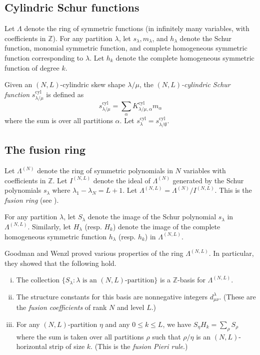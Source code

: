 \documentclass[a4paper,11pt,twoside]{amsart}
\newcommand{\Z}{\mathbb{Z}}
\newcommand{\cyl}{\mathrm{cyl}}
\begin{document}
\subsection{Cylindric Schur functions}
Let $\Lambda$ denote the ring of symmetric functions (in infinitely many variables, with coefficients in $\Z$). For any partition $\lambda$, let $s_{\lambda}, m_{\lambda}$, and $h_{\lambda}$ denote the Schur function, monomial symmetric function, and complete homogeneous symmetric function corresponding to $\lambda$. Let $h_k$ denote the complete homogeneous symmetric function of degree $k$.

Given an $(N,L)$-cylindric skew shape $\lambda/\mu$, the \emph{$(N,L)$-cylindric Schur function} $s^\cyl_{\lambda/\mu}$ is defined as
\[s^\cyl_{\lambda/\mu} = \sum_\alpha K^\cyl_{\lambda/\mu,\alpha} m_\alpha\]
where the sum is over all partitions $\alpha$. Let $s^\cyl_{\lambda} = s^\cyl_{\lambda/\emptyset}$.

\subsection{The fusion ring}

Let $\Lambda^{(N)}$ denote the ring of symmetric polynomials in $N$ variables with coefficients in $\Z$. Let $I^{(N,L)}$ denote the ideal of $\Lambda^{(N)}$ generated by the Schur polynomials $s_{\lambda}$ where $\lambda_1-\lambda_N = L+1$. Let $\Lambda^{(N,L)} = \Lambda^{(N)}/I^{(N,L)}$. This is the \emph{fusion ring} (see \cite{morse2012s}).

For any partition $\lambda$, let $S_\lambda$ denote the image of the Schur polynomial $s_\lambda$ in $\Lambda^{(N,L)}$. Similarly, let $H_\lambda$ (resp. $H_k$) denote the image of the complete homogeneous symmetric function $h_\lambda$ (resp. $h_k$) in $\Lambda^{(N,L)}$.

Goodman and Wenzl \cite{goodman1990w} proved various properties of the ring $\Lambda^{(N,L)}$. In particular, they showed that the following hold.
\begin{enumerate}[(i)]
    \item The collection $\{S_\lambda : \text{$\lambda$ is an $(N,L)$-partition}\}$ is a $\Z$-basis for $\Lambda^{(N,L)}$.
    \item The structure constants for this basis are nonnegative integers $d_{\mu\nu}^{\lambda}$. (These are the \emph{fusion coefficients} of rank $N$ and level $L$.)
    \item For any $(N,L)$-partition $\eta$ and any $0 \leq k \leq L$, we have $S_{\eta} H_k = \sum_{\rho} S_{\rho}$ where the sum is taken over all partitions $\rho$ such that $\rho/\eta$ is an $(N,L)$-horizontal strip of size $k$. (This is the \emph{fusion Pieri rule}.)
\end{enumerate}
\end{document}
